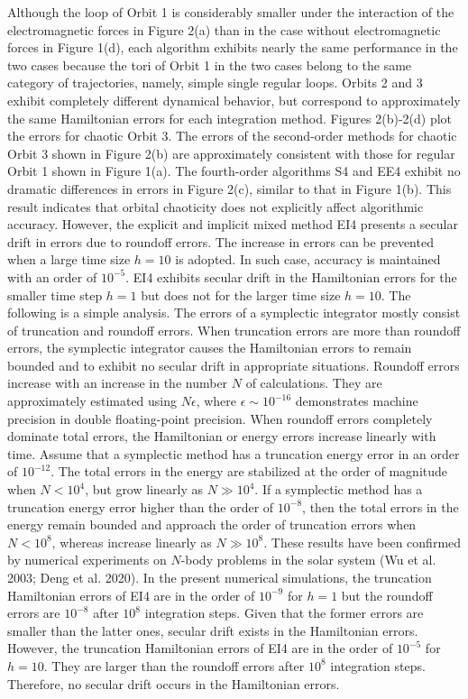 \documentclass[preprint2]{aastex}
\begin{document}
Although the loop of Orbit 1 is considerably smaller under the
interaction of the electromagnetic forces in Figure 2(a) than in
the case without electromagnetic forces in Figure 1(d), each
algorithm exhibits nearly the same performance in the two cases
because the tori of Orbit 1 in the two cases belong to the same
category of trajectories, namely, simple single regular loops.
Orbits 2 and 3 exhibit completely different dynamical behavior,
but correspond to approximately the same Hamiltonian errors for
each integration method. Figures 2(b)-2(d) plot the errors for
chaotic Orbit 3. The errors of the second-order methods for
chaotic Orbit 3 shown in Figure 2(b) are approximately consistent
with those for regular Orbit 1 shown in Figure 1(a). The
fourth-order algorithms S4 and EE4 exhibit no dramatic differences
in errors in Figure 2(c), similar to that in Figure 1(b). This
result indicates that orbital chaoticity does not explicitly
affect algorithmic accuracy. However, the explicit and implicit
mixed method EI4 presents a secular drift in errors due to
roundoff errors. The increase in errors can be prevented when a
large time size $h=10$ is adopted. In such case, accuracy is
maintained with an order of $10^{-5}$. EI4 exhibits secular drift
in the Hamiltonian errors for the smaller time step $h=1$ but does
not for the larger time size $h=10$. The following is a simple
analysis. The errors of a symplectic integrator mostly consist of
truncation and roundoff errors. When truncation errors are more
than roundoff errors, the symplectic integrator causes the
Hamiltonian errors to remain bounded and to exhibit no secular
drift in appropriate situations. Roundoff errors increase with an
increase in the number $N$ of calculations. They are approximately
estimated using $N\epsilon$, where $\epsilon\sim 10^{-16}$
demonstrates machine precision in double floating-point precision.
When roundoff errors completely dominate total errors, the
Hamiltonian or energy errors increase linearly with time. Assume
that a symplectic method has a truncation energy error in an order
of $10^{-12}$. The  total errors in the energy are stabilized at
the order of magnitude when $N<10^{4}$, but grow linearly as
$N\gg10^{4}$. If a symplectic method has a truncation energy error
higher than the order of $10^{-8}$, then the  total  errors in the
energy remain bounded and approach the order of truncation errors
when $N<10^{8}$, whereas increase linearly as $N\gg10^{8}$. These
results have been confirmed by numerical experiments on $N$-body
problems in the solar system (Wu et al. 2003; Deng et al. 2020).
In the present numerical simulations, the truncation Hamiltonian
errors of EI4 are in the order of $10^{-9}$ for $h=1$ but the
roundoff errors are $10^{-8}$ after $10^{8}$ integration steps.
Given that the former errors are smaller than the latter ones,
secular drift exists in the Hamiltonian errors. However, the
truncation Hamiltonian errors of EI4 are in the order of $10^{-5}$
for $h=10$. They are larger than  the roundoff errors after
$10^{8}$ integration steps. Therefore, no secular drift occurs in
the Hamiltonian errors.
\end{document}
